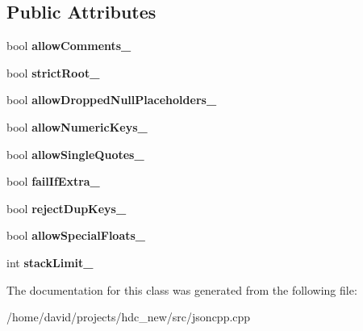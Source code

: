 \subsection*{Public Attributes}
\begin{DoxyCompactItemize}
\item 
bool {\bfseries allow\+Comments\+\_\+}\hypertarget{class_json_1_1_our_features_ac71bb7ba7363d3b05ed76602b036ce33}{}\label{class_json_1_1_our_features_ac71bb7ba7363d3b05ed76602b036ce33}

\item 
bool {\bfseries strict\+Root\+\_\+}\hypertarget{class_json_1_1_our_features_a2095f66a776c0a4ae6cc931a0c94242e}{}\label{class_json_1_1_our_features_a2095f66a776c0a4ae6cc931a0c94242e}

\item 
bool {\bfseries allow\+Dropped\+Null\+Placeholders\+\_\+}\hypertarget{class_json_1_1_our_features_a13963bc44bf948eec1968f7ff8e8f5f1}{}\label{class_json_1_1_our_features_a13963bc44bf948eec1968f7ff8e8f5f1}

\item 
bool {\bfseries allow\+Numeric\+Keys\+\_\+}\hypertarget{class_json_1_1_our_features_af6973fc7e774ce2d634ba99442aeb91a}{}\label{class_json_1_1_our_features_af6973fc7e774ce2d634ba99442aeb91a}

\item 
bool {\bfseries allow\+Single\+Quotes\+\_\+}\hypertarget{class_json_1_1_our_features_abbd6c196d7a22e2a360a59887eda4610}{}\label{class_json_1_1_our_features_abbd6c196d7a22e2a360a59887eda4610}

\item 
bool {\bfseries fail\+If\+Extra\+\_\+}\hypertarget{class_json_1_1_our_features_ae8ad25b90706c78f1a8fe929191ac61b}{}\label{class_json_1_1_our_features_ae8ad25b90706c78f1a8fe929191ac61b}

\item 
bool {\bfseries reject\+Dup\+Keys\+\_\+}\hypertarget{class_json_1_1_our_features_a39b8e0b86b1c24a45e800c023bb715aa}{}\label{class_json_1_1_our_features_a39b8e0b86b1c24a45e800c023bb715aa}

\item 
bool {\bfseries allow\+Special\+Floats\+\_\+}\hypertarget{class_json_1_1_our_features_af760f91cc2a7af37e44f78fb466061bb}{}\label{class_json_1_1_our_features_af760f91cc2a7af37e44f78fb466061bb}

\item 
int {\bfseries stack\+Limit\+\_\+}\hypertarget{class_json_1_1_our_features_a9a786713902d14be6d57a08cc03ccfff}{}\label{class_json_1_1_our_features_a9a786713902d14be6d57a08cc03ccfff}

\end{DoxyCompactItemize}


The documentation for this class was generated from the following file\+:\begin{DoxyCompactItemize}
\item 
/home/david/projects/hdc\+\_\+new/src/jsoncpp.\+cpp\end{DoxyCompactItemize}
